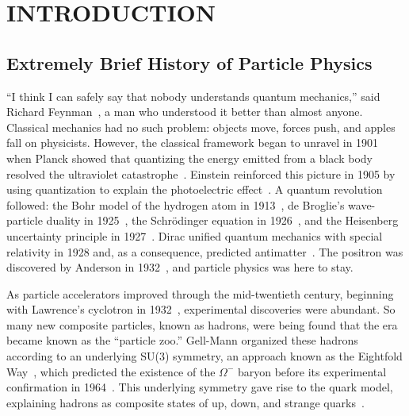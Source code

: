 
\begingroup
\clearpage%
\let\clearpage\relax%
\vspace*{-16pt}%
\chapter[INTRODUCTION]{INTRODUCTION}\label{chap:intro}
\endgroup

\section{Extremely Brief History of Particle Physics}

``I think I can safely say that nobody understands quantum mechanics,'' said Richard Feynman~\cite{Feynman1967}, a man who understood it better than almost anyone.
Classical mechanics had no such problem: objects move, forces push, and apples fall on physicists.
However, the classical framework began to unravel in 1901 when Planck showed that quantizing the energy emitted from a black body resolved the ultraviolet catastrophe~\cite{Planck1901}. 
Einstein reinforced this picture in 1905 by using quantization to explain the photoelectric effect~\cite{Einstein1905}. 
A quantum revolution followed: the Bohr model of the hydrogen atom in 1913~\cite{Bohr1913}, de Broglie's wave-particle duality in 1925~\cite{deBroglie1925}, the Schr\"{o}dinger equation in 1926~\cite{Schrodinger1926}, and the Heisenberg uncertainty principle in 1927~\cite{Heisenberg1927}.
Dirac unified quantum mechanics with special relativity in 1928 and, as a consequence, predicted antimatter~\cite{Dirac1928}.
The positron was discovered by Anderson in 1932~\cite{Anderson1933}, and particle physics was here to stay.

As particle accelerators improved through the mid-twentieth century, beginning with Lawrence's cyclotron in 1932~\cite{Lawrence1932}, experimental discoveries were abundant. 
So many new composite particles, known as hadrons, were being found that the era became known as the ``particle zoo.'' 
Gell-Mann organized these hadrons according to an underlying SU(3) symmetry, an approach known as the Eightfold Way~\cite{GellMann1961}, which predicted the existence of the $\Omega^-$ baryon before its experimental confirmation in 1964~\cite{Barnes1964}. 
This underlying symmetry gave rise to the quark model, explaining hadrons as composite states of up, down, and strange quarks~\cite{GellMann1964,Zweig1964}.

